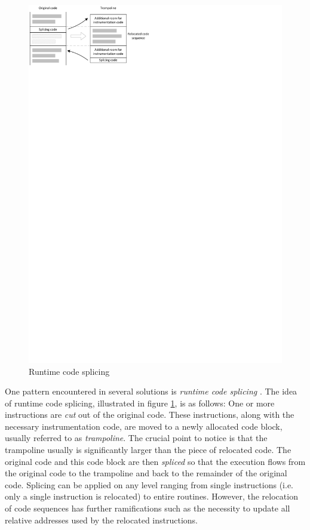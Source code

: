 \begin{figure}[htbp] 
\begin{centering} 
\includegraphics[scale=1, clip=true, viewport=0cm 24.5cm 10cm 30cm]{images/diagrams/CodeSplicing.pdf} 
\caption{Runtime code splicing} 
\label{CodeSplicing} 
\end{centering} 
\end{figure}

One pattern encountered in several solutions is \emph{runtime code splicing} \cite{thiemann99higherorder}. The idea
of runtime code splicing, illustrated in figure \ref{CodeSplicing}, is as follows: 
One or more instructions are \emph{cut} out of the original code. These instructions,
along with the necessary instrumentation code, are moved to a newly allocated code
block, usually referred to as \emph{trampoline}. The crucial point to notice is that the
trampoline usually is significantly larger than the piece of relocated code. 
The original code and this code block are then \emph{spliced} 
so that the execution flows from the original code to the trampoline and back to the 
remainder of the original code. Splicing can be applied on any level ranging from single
instructions (i.e. only a single instruction is relocated) to entire routines.
However, the relocation of code sequences has further ramifications such as the 
necessity to update all relative addresses used by the relocated instructions.


